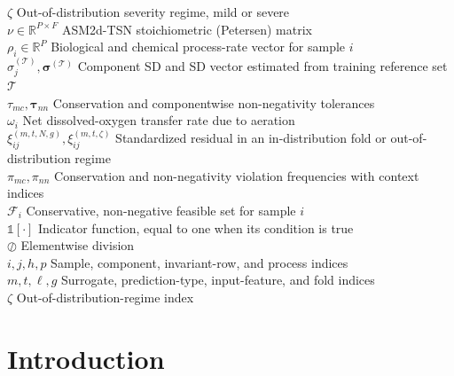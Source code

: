 \documentclass[a4paper,fleqn]{cas-sc}
\newcommand{\csvcomma}{,}
\begin{document}
\begin{tabbing}
$\zeta$ \> Out-of-distribution severity regime\csvcomma{} mild or severe \\
$\nu\in\mathbb{R}^{P\times F}$ \> ASM2d-TSN stoichiometric (Petersen) matrix \\
$\rho_i\in\mathbb{R}^{P}$ \> Biological and chemical process-rate vector for sample $i$ \\
$\sigma_j^{(\mathcal{T})}\csvcomma{}\boldsymbol{\sigma}^{(\mathcal{T})}$ \> Component SD and SD vector estimated from training reference set $\mathcal{T}$ \\
$\tau_{mc}\csvcomma{}\boldsymbol{\tau}_{nn}$ \> Conservation and componentwise non-negativity tolerances \\
$\omega_i$ \> Net dissolved-oxygen transfer rate due to aeration \\
$\xi_{ij}^{(m\csvcomma{}t\csvcomma{}N\csvcomma{}g)}\csvcomma{}\xi_{ij}^{(m\csvcomma{}t\csvcomma{}\zeta)}$ \> Standardized residual in an in-distribution fold or out-of-distribution regime \\
$\pi_{mc}\csvcomma{}\pi_{nn}$ \> Conservation and non-negativity violation frequencies with context indices \\
$\mathcal{F}_i$ \> Conservative\csvcomma{} non-negative feasible set for sample $i$ \\
$\mathbb{1}[\cdot]$ \> Indicator function\csvcomma{} equal to one when its condition is true \\
$\oslash$ \> Elementwise division \\
$i\csvcomma{}j\csvcomma{}h\csvcomma{}p$ \> Sample\csvcomma{} component\csvcomma{} invariant-row\csvcomma{} and process indices \\
$m\csvcomma{}t\csvcomma{}\ell\csvcomma{}g$ \> Surrogate\csvcomma{} prediction-type\csvcomma{} input-feature\csvcomma{} and fold indices \\
$\zeta$ \> Out-of-distribution-regime index \\
\end{tabbing}

\section{Introduction}
\end{document}
